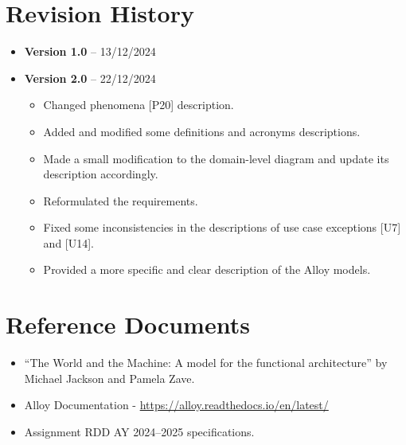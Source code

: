 \section{Revision History}\label{sec:revisionhistory}
\begin{itemize}
    \item \textbf{Version 1.0} – 13/12/2024
    \item \textbf{Version 2.0} – 22/12/2024
            \begin{itemize}
                \item Changed phenomena [P20] description.
                \item Added and modified some definitions and acronyms descriptions.
                \item Made a small modification to the domain-level diagram and update its description accordingly.
                \item Reformulated the requirements.
                \item Fixed some inconsistencies in the descriptions of use case exceptions [U7] and [U14].
                \item Provided a more specific and clear description of the Alloy models.
            \end{itemize}
\end{itemize}

\section{Reference Documents}\label{sec:reference}
\begin{itemize}
    \item ``The World and the Machine: A model for the functional architecture'' by Michael Jackson and Pamela Zave.
    \item Alloy Documentation - \url{https://alloy.readthedocs.io/en/latest/}
    \item Assignment RDD AY 2024–2025 specifications.
\end{itemize}

